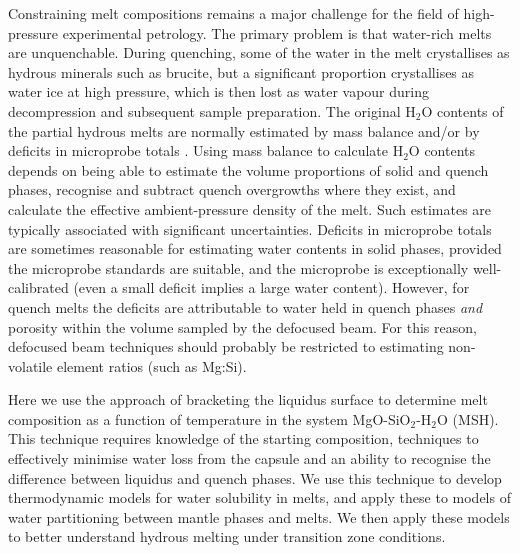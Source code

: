 \documentclass[review]{elsarticle}
\begin{document}
Constraining melt compositions remains a major challenge for the field of high-pressure experimental petrology. The primary problem is that water-rich melts are unquenchable. During quenching, some of the water in the melt crystallises as hydrous minerals such as brucite, but a significant proportion crystallises as water ice at high pressure, which is then lost as water vapour during decompression and subsequent sample preparation. The original H$_2$O contents of the partial hydrous melts are normally estimated by mass balance and/or by deficits in microprobe totals \citep[e.g.][]{OMY2000, DDFK2005, LSOK2011, MSUP2007}. Using mass balance to calculate H$_2$O contents depends on being able to estimate the volume proportions of solid and quench phases, recognise and subtract quench overgrowths where they exist, and calculate the effective ambient-pressure density of the melt. Such estimates are typically associated with significant uncertainties. Deficits in microprobe totals are sometimes reasonable for estimating water contents in solid phases, provided the microprobe standards are suitable, and the microprobe is exceptionally well-calibrated (even a small deficit implies a large water content). However, for quench melts the deficits are attributable to water held in quench phases \emph{and} porosity within the volume sampled by the defocused beam. For this reason, defocused beam techniques should probably be restricted to estimating non-volatile element ratios (such as Mg:Si).

Here we use the approach of bracketing the liquidus surface to determine melt composition as a function of temperature in the system MgO-SiO$_2$-H$_2$O (MSH). This technique requires knowledge of the starting composition, techniques to effectively minimise water loss from the capsule and an ability to recognise the difference between liquidus and quench phases. We use this technique to develop thermodynamic models for water solubility in melts, and apply these to models of water partitioning between mantle phases and melts. We then apply these models to better understand hydrous melting under transition zone conditions.
\end{document}

